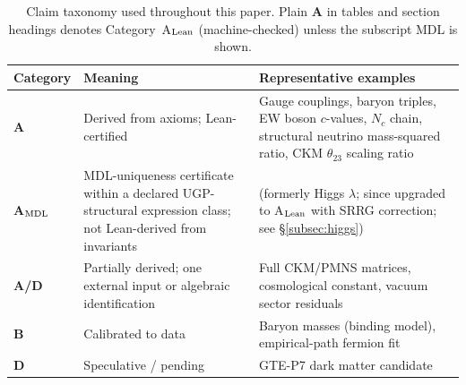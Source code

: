 \documentclass[11pt]{article}
\theoremstyle{remark}
\begin{document}
\begin{table}[ht]
\centering
\caption{Claim taxonomy used throughout this paper.  Plain \textbf{A} in tables and section headings denotes Category~A$_{\rm Lean}$ (machine-checked) unless the subscript MDL is shown.}
\label{tab:claim_taxonomy}
\small
\begin{tabular}{@{}l p{4.5cm} p{5.5cm}@{}}
\toprule
\textbf{Category} & \textbf{Meaning} & \textbf{Representative examples} \\
\midrule
\textbf{A} & Derived from axioms; Lean-certified & Gauge couplings, baryon triples, EW boson $c$-values, $N_c$ chain, structural neutrino mass-squared ratio, CKM $\theta_{23}$ scaling ratio \\
\textbf{A$_{\rm MDL}$} & MDL-uniqueness certificate within a declared UGP-structural expression class; not Lean-derived from invariants & (formerly Higgs $\lambda$; since upgraded to A$_{\rm Lean}$ with SRRG correction; see \S\ref{subsec:higgs}) \\
\textbf{A/D} & Partially derived; one external input or algebraic identification & Full CKM/PMNS matrices, cosmological constant, vacuum sector residuals \\
\textbf{B} & Calibrated to data & Baryon masses (binding model), empirical-path fermion fit \\
\textbf{D} & Speculative / pending & GTE-P7 dark matter candidate \\
\bottomrule
\end{tabular}
\end{table}
\end{document}
